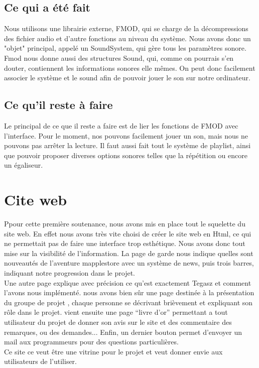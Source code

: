 \documentclass[12pt]{report}
\begin{document}
\section{Ce qui a été fait}
Nous utilisons une librairie externe, FMOD, qui se charge de la décompressions des fichier audio et d'autre fonctions au niveau du système. Nous avons donc un "objet" principal, appelé un SoundSystem, qui gère tous les paramètres sonore. Fmod nous donne aussi des structures Sound, qui, comme on pourrais s'en douter, contiennent les informations sonores elle mêmes. On peut donc facilement associer le système et le sound afin de pouvoir jouer le son sur notre ordinateur.\\

\section{Ce qu'il reste à faire}
Le principal de ce que il reste a faire est de lier les fonctions de FMOD avec l'interface. Pour le moment, nos pouvons facilement jouer un son, mais nous ne pouvons pas arrêter la lecture. Il faut aussi fait tout le système de playlist, ainsi que pouvoir proposer diverses options sonores telles que la répétition ou encore un égaliseur.\\

\chapter{Cite web}
Ppour cette première soutenance, nous avons mis en place tout le squelette du site web. En effet nous avons très vite choisi de créer le site web en Html, ce qui ne permettait pas de faire une interface trop esthétique. Nous avons donc tout mise sur la visibilité de l'information. La page de garde nous indique quelles sont nouveautés de l'aventure mapplestore avec un système de news, puis trois barres, indiquant notre progression dans le projet. \\
Une autre page explique avec précision ce qu'est exactement Tegasz et comment l'avons nous implémenté. nous avons bien sûr une page destinée à la présentation du groupe de projet , chaque personne se décrivant brièvement et expliquant son rôle dans le projet. vient ensuite une page ``livre d'or'' permettant a tout utilisateur du projet de donner son avis sur le site et des commentaire des remarques, ou des demandes... Enfin, un dernier bouton permet d'envoyer un mail aux programmeurs pour des questions particulières.\\
 Ce site ce veut être une vitrine pour le projet et veut donner envie aux utilisateurs de l'utiliser.
\end{document}
